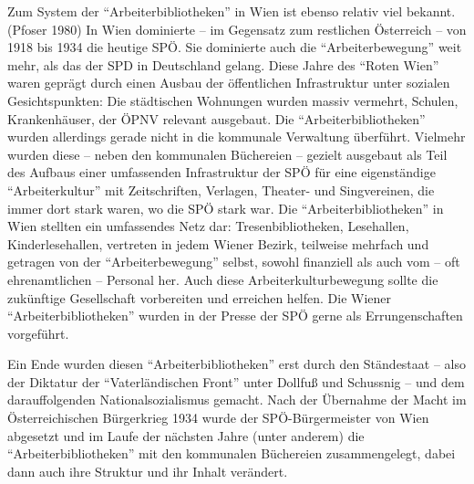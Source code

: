 \documentclass[a4paper,
fontsize=11pt,
oneside,
numbers=noperiodatend,
parskip=half-,
bibliography=totoc,
final
]{scrartcl}
\begin{document}
Zum System der \enquote{Arbeiterbibliotheken} in Wien ist ebenso relativ
viel bekannt. (Pfoser 1980) In Wien dominierte -- im Gegensatz zum
restlichen Österreich -- von 1918 bis 1934 die heutige SPÖ. Sie
dominierte auch die \enquote{Arbeiterbewegung} weit mehr, als das der
SPD in Deutschland gelang. Diese Jahre des \enquote{Roten Wien} waren
geprägt durch einen Ausbau der öffentlichen Infrastruktur unter sozialen
Gesichtspunkten: Die städtischen Wohnungen wurden massiv vermehrt,
Schulen, Krankenhäuser, der ÖPNV relevant ausgebaut. Die
\enquote{Arbeiterbibliotheken} wurden allerdings gerade nicht in die
kommunale Verwaltung überführt. Vielmehr wurden diese -- neben den
kommunalen Büchereien -- gezielt ausgebaut als Teil des Aufbaus einer
umfassenden Infrastruktur der SPÖ für eine eigenständige
\enquote{Arbeiterkultur} mit Zeitschriften, Verlagen, Theater- und
Singvereinen, die immer dort stark waren, wo die SPÖ stark war. Die
\enquote{Arbeiterbibliotheken} in Wien stellten ein umfassendes Netz
dar: Tresenbibliotheken, Lesehallen, Kinderlesehallen, vertreten in
jedem Wiener Bezirk, teilweise mehrfach und getragen von der
\enquote{Arbeiterbewegung} selbst, sowohl finanziell als auch vom -- oft
ehrenamtlichen -- Personal her. Auch diese Arbeiterkulturbewegung sollte
die zukünftige Gesellschaft vorbereiten und erreichen helfen. Die Wiener
\enquote{Arbeiterbibliotheken} wurden in der Presse der SPÖ gerne als
Errungenschaften vorgeführt.

Ein Ende wurden diesen \enquote{Arbeiterbibliotheken} erst durch den
Ständestaat -- also der Diktatur der \enquote{Vaterländischen Front}
unter Dollfuß und Schussnig -- und dem darauffolgenden
Nationalsozialismus gemacht. Nach der Übernahme der Macht im
Österreichischen Bürgerkrieg 1934 wurde der SPÖ-Bürgermeister von Wien
abgesetzt und im Laufe der nächsten Jahre (unter anderem) die
\enquote{Arbeiterbibliotheken} mit den kommunalen Büchereien
zusammengelegt, dabei dann auch ihre Struktur und ihr Inhalt verändert.
\end{document}
